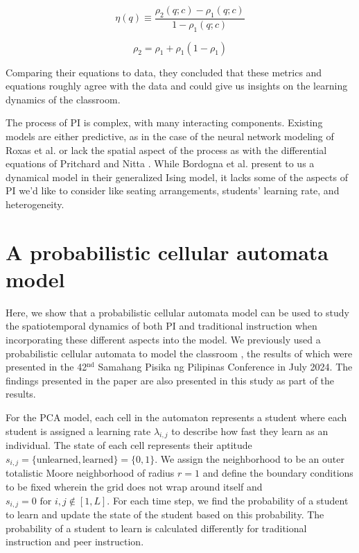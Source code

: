 \documentclass[twocolumn,secnumarabic,amssymb, nobibnotes, aps, prd]{revtex4-2}
\begin{document}
    \begin{equation}
        \label{eq: PIE}
        \eta(q) \equiv \frac{\rho_2(q;c)-\rho_1(q;c)}{1-\rho_1(q;c)}
    \end{equation}

    \begin{equation}
        \label{eq: nitta model}
        \rho_2 = \rho_1 +\rho_1(1-\rho_1)
    \end{equation}

    Comparing their equations to data, they concluded that these metrics and equations roughly agree with the data and could give us insights on the learning dynamics of the classroom.

    The process of PI is complex, with many interacting components.
    Existing models are either predictive, as in the case of the neural network modeling of Roxas et al. \cite{roxas2010seating} or lack the spatial aspect of the process as with the differential equations of Pritchard \cite{pritchard2008mathematical} and Nitta \cite{nitta2019mathematical}.
    While Bordogna et al. \cite{bordogna2001theoretical,bordogna2003simulation} present to us a dynamical model in their generalized Ising model, it lacks some of the aspects of PI we'd like to consider like seating arrangements, students' learning rate, and heterogeneity.

\section{A probabilistic cellular automata model}

    Here, we show that a probabilistic cellular automata model can be used to study the spatiotemporal dynamics of both PI and traditional instruction when incorporating these different aspects into the model.
    We previously used a probabilistic cellular automata to model the classroom \cite{SelfSPP}, the results of which were presented in the 42$^{\text{nd}}$ Samahang Pisika ng Pilipinas Conference in July 2024.
    The findings presented in the paper are also presented in this study as part of the results.

    For the PCA model, each cell in the automaton represents a student where each student is assigned a learning rate $\lambda_{i,j}$ to describe how fast they learn as an individual.
    The state of each cell represents their aptitude $s_{i,j}=\lbrace\text{unlearned},\text{learned}\rbrace=\lbrace0,1\rbrace$.
    We assign the neighborhood to be an outer totalistic Moore neighborhood of radius $r=1$ and define the boundary conditions to be fixed wherein the grid does not wrap around itself and $s_{i,j}=0 \text{ for }i,j\notin[1,L]$.
    For each time step, we find the probability of a student to learn and update the state of the student based on this probability.
    The probability of a student to learn is calculated differently for traditional instruction and peer instruction.
\end{document}
